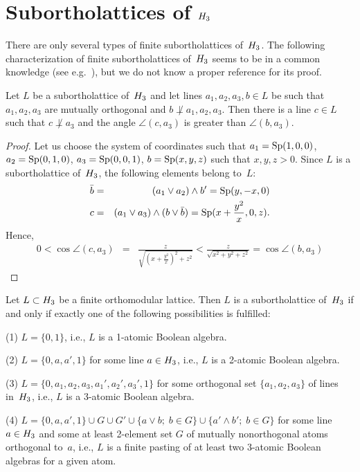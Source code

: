 \section {Subortholattices of $H_3$}


There are only several types of finite subortholattices of~$H_3$. The
following characterization of finite subortholattices of~$H_3$ seems to be in
a common knowledge (see e.g.~\cite[Example~1.5.3]{Kalmbach-83}), but we do
not know a proper reference for its proof.

\begin {lemma} \label {3lines}
Let $L$ be a subortholattice of~$H_3$ and let lines $a_1,a_2,a_3,b \in L$ be
such that $a_1,a_2,a_3$ are mutually orthogonal and $b \not\perp
a_1,a_2,a_3$. Then there is a line $c \in L$ such that $c \not\perp a_3$ and
the angle $\angle (c,a_3)$ is greater than $\angle (b,a_3)$.
\end {lemma}


\begin {proof}
Let us choose the system of coordinates such that $a_1 = {\rm Sp} (1,0,0)$, $a_2
= {\rm Sp} (0,1,0)$, $a_3 = {\rm Sp} (0,0,1)$, $b = {\rm Sp} (x,y,z)$ such that $x,y,z >0$.
Since $L$ is a subortholattice of~$H_3$, the following elements belong
to~$L$:
  \begin {eqnarray*}
  \bar b &=& (a_1 \lor a_2) \land b'              = {\rm Sp} (y,-x,0) \\
       c &=& (a_1 \lor a_3) \land (b \lor \bar b) = {\rm Sp} (x+\frac{y^2}{x},0,z).
  \end {eqnarray*}
Hence,
  \begin {eqnarray*}
  0 < \cos \angle (c,a_3) &=& \frac {z}{\sqrt { (x+\frac {y^2}{x})^2 + z^2} }
                          <  \frac {z}{\sqrt { x^2 + y^2 + z^2} }
                          = \cos \angle (b,a_3)
  \end {eqnarray*}
\end {proof}


\begin {theorem} \label {finitesubortholattices}
Let $L \subset H_3$ be a finite orthomodular lattice. Then $L$ is a
subortholattice of~$H_3$ if and only if exactly one of the following
possibilities is fulfilled:

{\rm (1)} $L = \{0,1\}$, i.e., $L$ is a 1-atomic Boolean algebra.

{\rm (2)} $L = \{0,a,a',1\}$ for some line $a \in H_3$, i.e., $L$ is a
2-atomic Boolean algebra.

{\rm (3)} $L = \{0,a_1,a_2,a_3,a_1',a_2',a_3',1\}$ for some orthogonal set
$\{a_1,a_2,a_3\}$ of lines in~$H_3$, i.e., $L$ is a 3-atomic Boolean
algebra.

{\rm (4)} $L = \{0,a,a',1\} \cup G \cup G' \cup \{a \lor b;\; b \in G\} \cup
\{a' \land b';\; b \in G\}$ for some line $a \in H_3$ and some at least
2-element set $G$ of mutually nonorthogonal atoms orthogonal to~$a$, i.e.,
$L$ is a finite pasting of at least two 3-atomic Boolean algebras for a
given atom.
\end {theorem}


